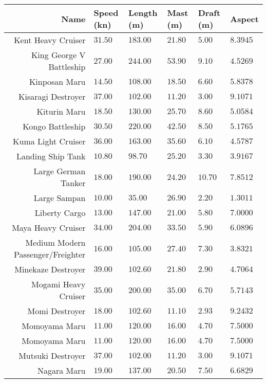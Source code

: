 \documentclass{article}
\begin{document}
\pagebreak
\begin{tabularx}{\textwidth}{|r|l|l|l|l|X|}
\hline
\textbf{Name} & \textbf{Speed (kn)} & \textbf{Length (m)} & \textbf{Mast (m)} & \textbf{Draft (m)} & \textbf{Aspect}\\
\hline
Kent Heavy Cruiser & $31.50$ & $183.00$ & $21.80$ & $5.00$ & $8.3945$ \\
\hline
King George V Battleship & $27.00$ & $244.00$ & $53.90$ & $9.10$ & $4.5269$ \\
\hline
Kinposan Maru & $14.50$ & $108.00$ & $18.50$ & $6.60$ & $5.8378$ \\
\hline
Kisaragi Destroyer & $37.00$ & $102.00$ & $11.20$ & $3.00$ & $9.1071$ \\
\hline
Kiturin Maru & $18.50$ & $130.00$ & $25.70$ & $8.60$ & $5.0584$ \\
\hline
Kongo Battleship & $30.50$ & $220.00$ & $42.50$ & $8.50$ & $5.1765$ \\
\hline
Kuma Light Cruiser & $36.00$ & $163.00$ & $35.60$ & $6.10$ & $4.5787$ \\
\hline
Landing Ship Tank & $10.80$ & $98.70$ & $25.20$ & $3.30$ & $3.9167$ \\
\hline
Large German Tanker & $18.00$ & $190.00$ & $24.20$ & $10.70$ & $7.8512$ \\
\hline
Large Sampan & $10.00$ & $35.00$ & $26.90$ & $2.20$ & $1.3011$ \\
\hline
Liberty Cargo & $13.00$ & $147.00$ & $21.00$ & $5.80$ & $7.0000$ \\
\hline
Maya Heavy Cruiser & $34.00$ & $204.00$ & $33.50$ & $5.90$ & $6.0896$ \\
\hline
Medium Modern Passenger/Freighter & $16.00$ & $105.00$ & $27.40$ & $7.30$ & $3.8321$ \\
\hline
Minekaze Destroyer & $39.00$ & $102.60$ & $21.80$ & $2.90$ & $4.7064$ \\
\hline
Mogami Heavy Cruiser & $35.00$ & $200.00$ & $35.00$ & $6.70$ & $5.7143$ \\
\hline
Momi Destroyer & $18.00$ & $102.60$ & $11.10$ & $2.93$ & $9.2432$ \\
\hline
Momoyama Maru & $11.00$ & $120.00$ & $16.00$ & $4.70$ & $7.5000$ \\
\hline
Momoyama Maru & $11.00$ & $120.00$ & $16.00$ & $4.70$ & $7.5000$ \\
\hline
Mutsuki Destroyer & $37.00$ & $102.00$ & $11.20$ & $3.00$ & $9.1071$ \\
\hline
Nagara Maru & $19.00$ & $137.00$ & $20.50$ & $7.50$ & $6.6829$ \\

\end{tabularx}
\end{document}
